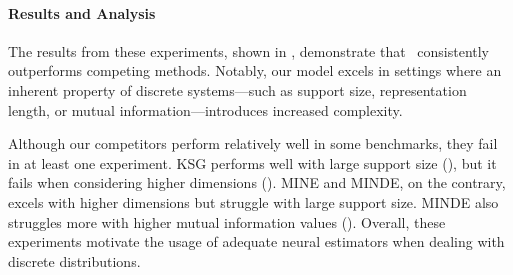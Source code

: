

\paragraph{Results and Analysis} The results from these experiments, shown in , demonstrate that \infosedd\ consistently outperforms competing methods. Notably, our model excels in settings where an inherent property of discrete systems—such as support size, representation length, or mutual information—introduces increased complexity.

Although our competitors perform relatively well in some benchmarks, they fail in at least one experiment. KSG performs well with large support size (), but it fails when considering higher dimensions (). MINE and MINDE, on the contrary, excels with higher dimensions but struggle with large support size. MINDE also struggles more with higher mutual information values (). Overall, these experiments motivate the usage of adequate neural estimators when dealing with discrete distributions. 

